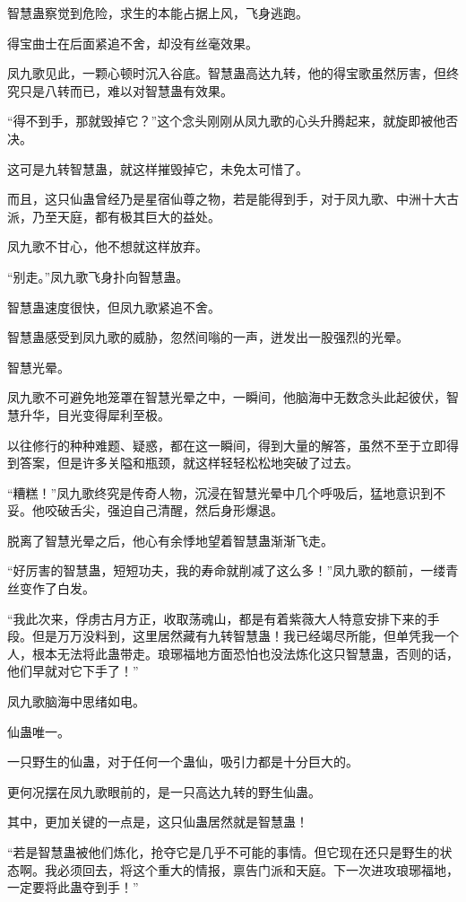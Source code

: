 \begin{this_body}
智慧蛊察觉到危险，求生的本能占据上风，飞身逃跑。

得宝曲士在后面紧追不舍，却没有丝毫效果。

凤九歌见此，一颗心顿时沉入谷底。智慧蛊高达九转，他的得宝歌虽然厉害，但终究只是八转而已，难以对智慧蛊有效果。

“得不到手，那就毁掉它？”这个念头刚刚从凤九歌的心头升腾起来，就旋即被他否决。

这可是九转智慧蛊，就这样摧毁掉它，未免太可惜了。

而且，这只仙蛊曾经乃是星宿仙尊之物，若是能得到手，对于凤九歌、中洲十大古派，乃至天庭，都有极其巨大的益处。

凤九歌不甘心，他不想就这样放弃。

“别走。”凤九歌飞身扑向智慧蛊。

智慧蛊速度很快，但凤九歌紧追不舍。

智慧蛊感受到凤九歌的威胁，忽然间嗡的一声，迸发出一股强烈的光晕。

智慧光晕。

凤九歌不可避免地笼罩在智慧光晕之中，一瞬间，他脑海中无数念头此起彼伏，智慧升华，目光变得犀利至极。

以往修行的种种难题、疑惑，都在这一瞬间，得到大量的解答，虽然不至于立即得到答案，但是许多关隘和瓶颈，就这样轻轻松松地突破了过去。

“糟糕！”凤九歌终究是传奇人物，沉浸在智慧光晕中几个呼吸后，猛地意识到不妥。他咬破舌尖，强迫自己清醒，然后身形爆退。

脱离了智慧光晕之后，他心有余悸地望着智慧蛊渐渐飞走。

“好厉害的智慧蛊，短短功夫，我的寿命就削减了这么多！”凤九歌的额前，一缕青丝变作了白发。

“我此次来，俘虏古月方正，收取荡魂山，都是有着紫薇大人特意安排下来的手段。但是万万没料到，这里居然藏有九转智慧蛊！我已经竭尽所能，但单凭我一个人，根本无法将此蛊带走。琅琊福地方面恐怕也没法炼化这只智慧蛊，否则的话，他们早就对它下手了！”

凤九歌脑海中思绪如电。

仙蛊唯一。

一只野生的仙蛊，对于任何一个蛊仙，吸引力都是十分巨大的。

更何况摆在凤九歌眼前的，是一只高达九转的野生仙蛊。

其中，更加关键的一点是，这只仙蛊居然就是智慧蛊！

“若是智慧蛊被他们炼化，抢夺它是几乎不可能的事情。但它现在还只是野生的状态啊。我必须回去，将这个重大的情报，禀告门派和天庭。下一次进攻琅琊福地，一定要将此蛊夺到手！”


\end{this_body}
